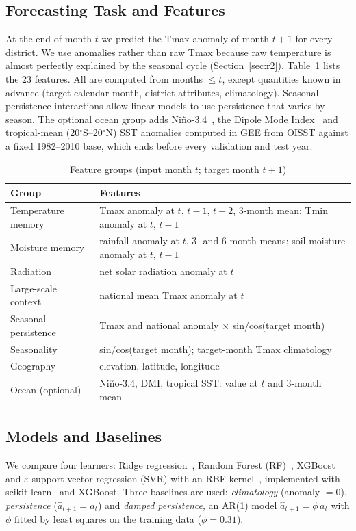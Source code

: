 \documentclass[conference]{IEEEtran}
\begin{document}
\subsection{Forecasting Task and Features}
At the end of month $t$ we predict the Tmax anomaly of month $t+1$ for every district. We use anomalies rather than raw Tmax because raw temperature is almost perfectly explained by the seasonal cycle (Section~\ref{sec:r2}). Table~\ref{tab:features} lists the 23 features. All are computed from months $\le t$, except quantities known in advance (target calendar month, district attributes, climatology). Seasonal-persistence interactions allow linear models to use persistence that varies by season. The optional ocean group adds Ni\~{n}o-3.4~\cite{huang2021}, the Dipole Mode Index~\cite{saji1999} and tropical-mean (20$^\circ$S--20$^\circ$N) SST anomalies computed in GEE from OISST against a fixed 1982--2010 base, which ends before every validation and test year.

\begin{table}[t]
\centering
\caption{Feature groups (input month $t$; target month $t+1$)}
\label{tab:features}
\small
\begin{tabular}{@{}p{2.3cm}p{5.4cm}@{}}
\toprule
Group & Features \\
\midrule
Temperature memory & Tmax anomaly at $t$, $t-1$, $t-2$, 3-month mean; Tmin anomaly at $t$, $t-1$ \\
Moisture memory & rainfall anomaly at $t$, 3- and 6-month means; soil-moisture anomaly at $t$, $t-1$ \\
Radiation & net solar radiation anomaly at $t$ \\
Large-scale context & national mean Tmax anomaly at $t$ \\
Seasonal persistence & Tmax and national anomaly $\times$ sin/cos(target month) \\
Seasonality & sin/cos(target month); target-month Tmax climatology \\
Geography & elevation, latitude, longitude \\
\midrule
Ocean (optional) & Ni\~{n}o-3.4, DMI, tropical SST: value at $t$ and 3-month mean \\
\bottomrule
\end{tabular}
\end{table}

\subsection{Models and Baselines}
We compare four learners: Ridge regression~\cite{hoerl1970}, Random Forest (RF)~\cite{breiman2001}, XGBoost~\cite{chen2016} and $\varepsilon$-support vector regression (SVR) with an RBF kernel~\cite{drucker1997}, implemented with scikit-learn~\cite{pedregosa2011} and XGBoost. Three baselines are used: \emph{climatology} (anomaly $=0$), \emph{persistence} ($\hat a_{t+1}=a_t$) and \emph{damped persistence}, an AR(1) model $\hat a_{t+1}=\phi\,a_t$ with $\phi$ fitted by least squares on the training data ($\phi=0.31$).
\end{document}
